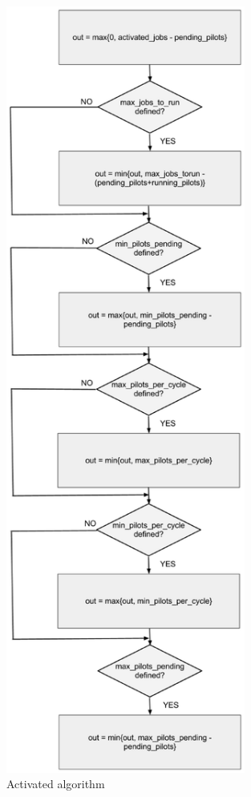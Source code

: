 \documentclass[a4paper]{jpconf}
\begin{document}
\begin{figure}
\centering\includegraphics[width=0.7\textwidth]{activated}
\caption{Activated algorithm}
\label{activatedfigure}
\end{figure}
\end{document}
